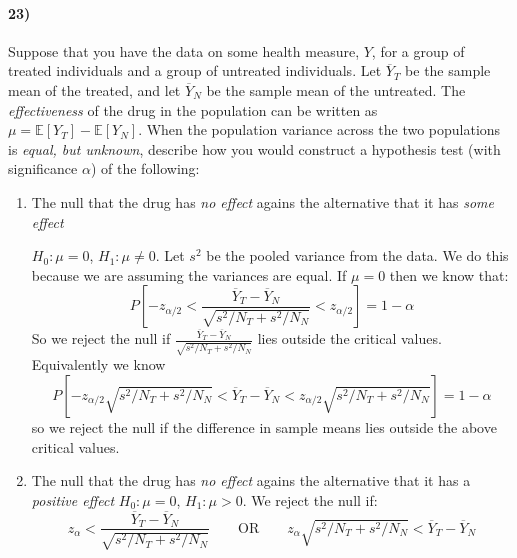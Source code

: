 \documentclass[12pt]{article}
\newcommand\ov{\overline}
\newcommand\EE{\mathbb{E}}
\numberwithin{equation}{section}
\numberwithin{figure}{section}
\numberwithin{table}{section}
\begin{document}
\paragraph{23)}  Suppose that you have the data on some health measure, $Y$, for a group of treated individuals and a group of untreated individuals. Let $\ov{Y}_T$ be the sample mean of the treated, and let $\ov{Y}_N$ be the sample mean of the untreated. The \emph{effectiveness} of the drug in the population can be written as $\mu=\EE[Y_T]-\EE[Y_N]$. When the population variance across the two populations is \emph{equal, but unknown}, describe how you would construct a hypothesis test (with significance $\alpha$) of the following:
\begin{enumerate}
\item The null that the drug has \emph{no effect} agains the alternative that it has \emph{some effect} \\
{\color{blue} $H_0: \mu=0$, $H_1: \mu\neq 0$. Let $s^2$ be the pooled variance from the data. We do this because we are assuming the variances are equal. If $\mu=0$ then we know that:
\[P[-z_{\alpha/2} < \frac{\ov{Y}_T-\ov{Y}_N}{\sqrt{s^2/N_T+s^2/N_N}} < z_{\alpha/2}]=1-\alpha\]
So we reject the null if $\frac{\ov{Y}_T-\ov{Y}_N}{\sqrt{s^2/N_T+s^2/N_N}}$ lies outside the critical values. Equivalently we know
\[P[-z_{\alpha/2}\sqrt{s^2/N_T+s^2/N_N} < \ov{Y}_T-\ov{Y}_N < z_{\alpha/2}\sqrt{s^2/N_T+s^2/N_N}]=1-\alpha\]
so we reject the null if the difference in sample means lies outside the above critical values.

}
\item The null that the drug has \emph{no effect} agains the alternative that it has a \emph{positive effect}
{\color{blue} $H_0: \mu=0$, $H_1: \mu> 0$. We reject the null if:
\[z_{\alpha}<\frac{\ov{Y}_T-\ov{Y}_N}{\sqrt{s^2/N_T+s^2/N_N}}\qquad\text{OR}\qquad z_{\alpha}\sqrt{s^2/N_T+s^2/N_N} < \ov{Y}_T-\ov{Y}_N\]
}
\end{enumerate}
\end{document}
